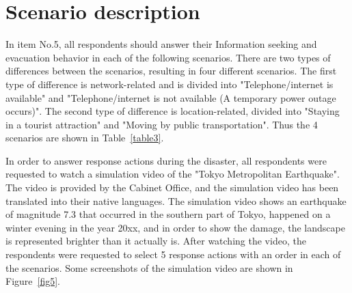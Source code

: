 \section{Scenario description}
In item No.5, all respondents should answer their Information seeking and evacuation behavior in each of the following scenarios. There are two types of differences between the scenarios, resulting in four different scenarios. The first type of difference is network-related and is divided into "Telephone/internet is available" and "Telephone/internet is not available (A temporary power outage occurs)". The second type of difference is location-related, divided into "Staying in a tourist attraction" and "Moving by public transportation". Thus the 4 scenarios are shown in Table~\ref{table3}.

In order to answer response actions during the disaster, all respondents were requested to watch a simulation video of the "Tokyo Metropolitan Earthquake". The video is provided by the Cabinet Office,  and the simulation video has been translated into their native languages. The simulation video shows an earthquake of magnitude 7.3 that occurred in the southern part of Tokyo, happened on a winter evening in the year 20xx, and in order to show the damage, the landscape is represented brighter than it actually is. After watching the video, the respondents were requested to select 5 response actions with an order in each of the scenarios. Some screenshots of the simulation video are shown in Figure~\ref{fig5}.

